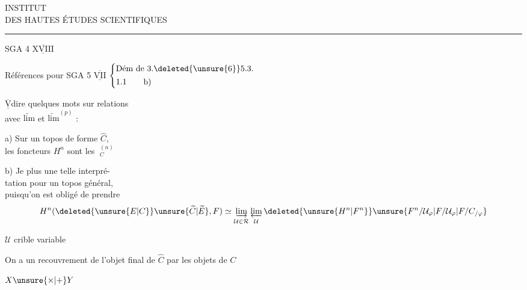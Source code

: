 \begin{center}
INSTITUT\\
DES HAUTES ÉTUDES SCIENTIFIQUES\\
\rule{2.3em}{0.4pt}
\end{center}

\noindent\begin{minipage}{0.6\linewidth}
SGA 4 $\underline{\overline{\mathrm{XVIII}}}$\\[0.8em]
\hspace*{3em}
\end{minipage}

\medskip
\noindent Références pour SGA 5 $\underline{\overline{\mathrm{VII}}}$\quad
$\left\{\begin{array}{@{}l@{}}
\text{Dém de 3.\deleted{\unsure{6}}5.3.}\\[.4em]
\text{1.1\qquad b)}
\end{array}\right.$

\medskip
\noindent{}

$\underline{\overline{\mathrm{V}}}$\qquad dire quelques mots sur relations\\
\hspace*{2.7em}avec $\underleftarrow{\mathrm{lim}}$ et ${\underleftarrow{\mathrm{lim}}}^{(p)}$ :

a) Sur un topos de  forme $\widehat C$,\\
\hspace*{1.4em}les foncteurs $H^n$ sont les $\mathop{\underleftarrow{\mathrm{lim}}}\nolimits_C^{(n)}$

b) Je  plus une telle interpré-\\
\hspace*{1.4em}tation pour un topos général,\\
\hspace*{1.4em}puisqu'on est obligé de prendre
\[
 H^{n}(\deleted{\unsure{E|C}}\unsure{\widetilde C|\widetilde E},F)\simeq
 \mathop{\underrightarrow{\mathrm{lim}}}_{\mathcal U\in\mathcal R}
 \mathop{\underleftarrow{\mathrm{lim}}}_{\mathcal U}
 \deleted{\unsure{H^n|F^n}}\unsure{F^{n}/\mathcal U_{\varphi}|F/\mathcal U_{\varphi}|F/C_{/\varphi}}
\]

$\mathcal U$ crible variable

On a un recouvrement de l'objet final de $\widehat C$ par les objets de $C$

\bigskip
\noindent\hspace*{2.4em}$X\unsure{\times|+}Y$

